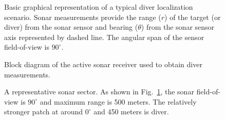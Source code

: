 \documentclass{article} %
\begin{document}
\begin{figure}
  \centering
  \caption{Basic graphical representation of a typical diver localization scenario. Sonar
    measurements provide the range ($r$) of the target (or diver) from the sonar sensor and
    bearing ($\theta$) from the sonar sensor axis represented by dashed line. The angular
    span of the sensor field-of-view is $90^{\circ}$.}
  \label{fig:sector_cartoon}
\end{figure}

\begin{figure}
  \centering
  \caption{Block diagram of the active sonar receiver used to obtain diver measurements.}
  \label{fig:blocks}
\end{figure}

\begin{figure}
  \centering
  \caption{A representative sonar sector. As shown in Fig.~\ref{fig:sector_cartoon}, the
    sonar field-of-view is $90^{\circ}$ and maximum range is 500 meters. The relatively
    stronger patch at around $0^{\circ}$ and 450 meters is diver.}
  \label{fig:sector_example}
\end{figure}
\end{document}
